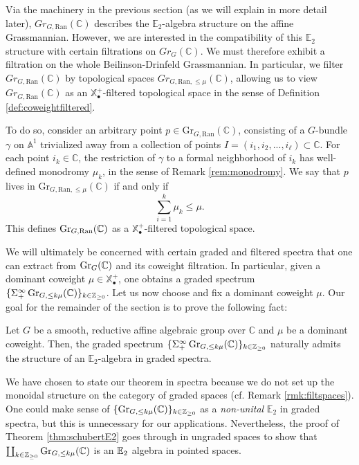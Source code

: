 Via the machinery in the previous section (as we will explain in more detail later), $Gr_{G,\text{Ran}}(\mathbb{C})$ describes the $\mathbb{E}_2$-algebra structure on the affine Grassmannian.  However, we are interested in the compatibility of this $\mathbb{E}_2$ structure with certain filtrations on $Gr_G(\mathbb{C})$.  We must therefore exhibit a filtration on the whole Beilinson-Drinfeld Grassmannian.  In particular, we filter $Gr_{G,\text{Ran}}(\mathbb{C})$ by topological spaces $Gr_{G,\text{Ran},\le \mu}(\mathbb{C})$, allowing us to view $Gr_{G,\text{Ran}}(\mathbb{C})$ as an $\mathbb{X}_{\bullet}^+$-filtered topological space in the sense of Definition \ref{def:coweightfiltered}.  

To do so, consider an arbitrary point $p \in \text{Gr}_{G,\text{Ran}}(\mathbb{C})$, consisting of a $G$-bundle $\gamma$ on $\mathbb{A}^1$ trivialized away from a collection of points $I=(i_1,i_2,...,i_\ell) \subset \mathbb{C}$.  For each point $i_k \in \mathbb{C}$, the restriction of $\gamma$ to a formal neighborhood of $i_k$ has well-defined monodromy $\mu_k$, in the sense of Remark \ref{rem:monodromy}.  We say that $p$ lives in $\text{Gr}_{G,\text{Ran},\le \mu}(\mathbb{C})$ if and only if
$$\sum_{i=1}^{k} \mu_k \le \mu.$$  This defines $\operatorname{\mathrm{Gr}}_{G,\operatorname{\mathrm{Ran}}}(\mathbb{C})$ as a $\mathbb{X}^+_{\bullet}$-filtered topological space.

We will ultimately be concerned with certain graded and filtered spectra that one can extract from $\operatorname{\mathrm{Gr}}_{G}(\mathbb{C})$ and its coweight filtration.  In particular, given a dominant coweight $\mu \in \mathbb{X}^+_{\bullet}$, one obtains a graded spectrum $ \{ \Sigma^{\infty}_+ \operatorname{\mathrm{Gr}}_{G,\leq k\mu}(\mathbb{C})\}_{k\in \mathbb{Z}_{\geq 0}}$.  Let us now choose and fix a dominant coweight $\mu$. Our goal for the remainder of the section is to prove the following fact:

\begin{thm}\label{thm:schubertE2}
Let $G$ be a smooth, reductive affine algebraic group over $\mathbb{C}$ and $\mu$ be a dominant coweight.  Then, the graded spectrum $\{\Sigma^{\infty}_+ \operatorname{\mathrm{Gr}}_{G, \leq k \mu}(\mathbb{C}) \}_{k\in \mathbb{Z}_{\geq 0}}$ naturally admits the structure of an $\mathbb{E}_2$-algebra in graded spectra. 
\end{thm}

\begin{rmk}\label{rmk:choosespectra}
We have chosen to state our theorem in spectra because we do not set up the monoidal structure on the category of graded spaces (cf. Remark \ref{rmk:filtspaces}).  One could make sense of $\{ \operatorname{\mathrm{Gr}}_{G,\leq k \mu}(\mathbb{C}) \}_{k\in \mathbb{Z}_{\geq 0}}$ as a \emph{non-unital} $\mathbb{E}_2$ in graded spectra, but this is unnecessary for our applications.  Nevertheless, the proof of Theorem \ref{thm:schubertE2} goes through in ungraded spaces to show that $\coprod_{k\in \mathbb{Z}_{\geq 0}} \operatorname{\mathrm{Gr}}_{G,\leq  k\mu}(\mathbb{C})$ is an $\operatorname{\mathbb{E}}_2$ algebra in pointed spaces.  
\end{rmk}

